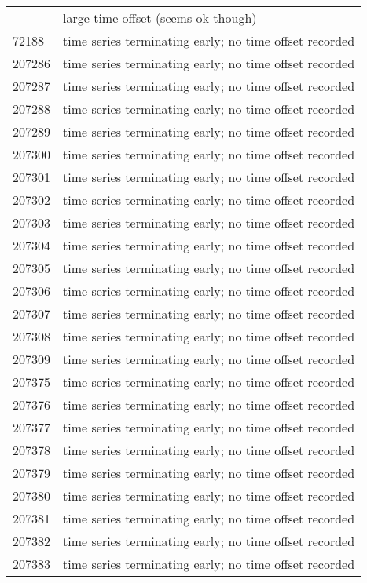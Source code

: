 \begin{longtable}{p{1.5cm}p{10cm}}
\bottomrule
\endlastfoot
72183  &                     large time offset (seems ok though) \\
72188  &  time series terminating early; no time offset recorded \\
207286 &  time series terminating early; no time offset recorded \\
207287 &  time series terminating early; no time offset recorded \\
207288 &  time series terminating early; no time offset recorded \\
207289 &  time series terminating early; no time offset recorded \\
207300 &  time series terminating early; no time offset recorded \\
207301 &  time series terminating early; no time offset recorded \\
207302 &  time series terminating early; no time offset recorded \\
207303 &  time series terminating early; no time offset recorded \\
207304 &  time series terminating early; no time offset recorded \\
207305 &  time series terminating early; no time offset recorded \\
207306 &  time series terminating early; no time offset recorded \\
207307 &  time series terminating early; no time offset recorded \\
207308 &  time series terminating early; no time offset recorded \\
207309 &  time series terminating early; no time offset recorded \\
207375 &  time series terminating early; no time offset recorded \\
207376 &  time series terminating early; no time offset recorded \\
207377 &  time series terminating early; no time offset recorded \\
207378 &  time series terminating early; no time offset recorded \\
207379 &  time series terminating early; no time offset recorded \\
207380 &  time series terminating early; no time offset recorded \\
207381 &  time series terminating early; no time offset recorded \\
207382 &  time series terminating early; no time offset recorded \\
207383 &  time series terminating early; no time offset recorded \\
\end{longtable}
